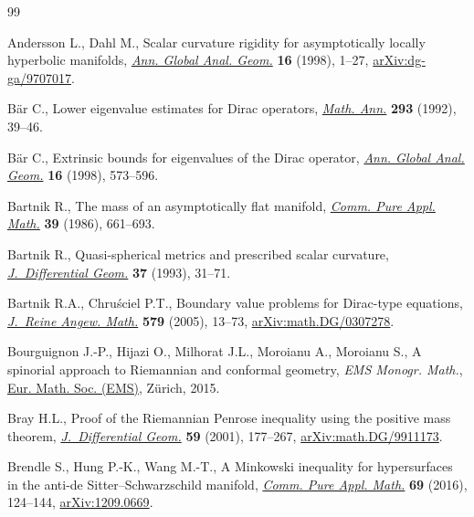 \begin{thebibliography}{99}
\footnotesize\itemsep=0pt

Andersson L., Dahl M., Scalar curvature rigidity for asymptotically locally
 hyperbolic manifolds, \href{https://doi.org/10.1023/A:1006547905892}{\textit{Ann. Global Anal. Geom.}} \textbf{16} (1998),
 1--27, \href{https://arxiv.org/abs/dg-ga/9707017}{arXiv:dg-ga/9707017}.

B\"ar C., Lower eigenvalue estimates for {D}irac operators, \href{https://doi.org/10.1007/BF01444701}{\textit{Math. Ann.}}
 \textbf{293} (1992), 39--46.

B\"ar C., Extrinsic bounds for eigenvalues of the {D}irac operator,
 \href{https://doi.org/10.1023/A:1006550532236}{\textit{Ann. Global Anal. Geom.}} \textbf{16} (1998), 573--596.

Bartnik R., The mass of an asymptotically flat manifold, \href{https://doi.org/10.1002/cpa.3160390505}{\textit{Comm. Pure
 Appl. Math.}} \textbf{39} (1986), 661--693.

Bartnik R., Quasi-spherical metrics and prescribed scalar curvature,
 \href{https://doi.org/10.4310/jdg/1214453422}{\textit{J.~Differential Geom.}} \textbf{37} (1993), 31--71.

Bartnik R.A., Chru\'sciel P.T., Boundary value problems for {D}irac-type
 equations, \href{https://doi.org/10.1515/crll.2005.2005.579.13}{\textit{J.~Reine Angew. Math.}} \textbf{579} (2005), 13--73,
 \href{https://arxiv.org/abs/math.DG/0307278}{arXiv:math.DG/0307278}.

Bourguignon J.-P., Hijazi O., Milhorat J.L., Moroianu A., Moroianu S., A
 spinorial approach to {R}iemannian and conformal geometry, \textit{EMS Monogr. Math.},
 \href{https://doi.org/10.4171/136}{Eur. Math. Soc. (EMS)}, Z\"urich, 2015.

Bray H.L., Proof of the {R}iemannian {P}enrose inequality using the positive
 mass theorem, \href{https://doi.org/10.4310/jdg/1090349428}{\textit{J.~Differential Geom.}} \textbf{59} (2001), 177--267,
 \href{https://arxiv.org/abs/math.DG/9911173}{arXiv:math.DG/9911173}.

Brendle S., Hung P.-K., Wang M.-T., A {M}inkowski inequality for hypersurfaces in
 the anti-de {S}itter--{S}chwarzschild manifold, \href{https://doi.org/10.1002/cpa.21556}{\textit{Comm. Pure Appl.
 Math.}} \textbf{69} (2016), 124--144, \href{https://arxiv.org/abs/1209.0669}{arXiv:1209.0669}.


\end{thebibliography}
